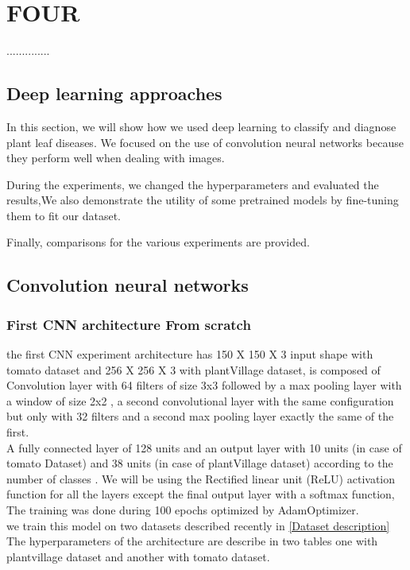 \let\textcircled=\pgftextcircled
\chapter{FOUR}
..............
\section{Deep learning approaches}
In this section, we will show how we used deep learning to classify and diagnose plant leaf diseases. We focused on the use of convolution neural networks because they perform well when dealing with images.

During the experiments, we changed the hyperparameters and evaluated the results,We also demonstrate the utility of some pretrained models by fine-tuning them to fit our dataset.

Finally, comparisons for the various experiments are provided.
\section{Convolution neural networks}
\subsection{First CNN architecture From scratch}
the first CNN experiment architecture has  150 X 150 X 3 input shape with tomato dataset and 256 X 256 X 3 with plantVillage dataset, is composed of Convolution layer with 64 filters of size 3x3 followed by a max pooling layer with a window of size 2x2 , a second convolutional layer with the same configuration but only with 32 filters and a second max pooling layer exactly the same of the first. \\
A fully connected layer of 128 units and an output layer with 10 units (in case of tomato Dataset) and 38 units (in case of plantVillage dataset) according to the number of classes .
We will be using the Rectified linear unit (ReLU) activation
function for all the layers except the final output layer with a softmax function,
The training was done
during 100 epochs optimized by AdamOptimizer.\\
we train this model on two datasets described recently in \ref{Dataset description}
The hyperparameters of the architecture are
describe in two tables one with plantvillage dataset and another with tomato dataset.\\

